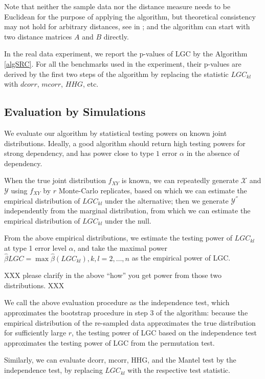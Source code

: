 \documentclass[11pt]{article}
\begin{document}
Note that neither the sample data nor the distance measure needs to be Euclidean for the purpose of applying the algorithm, but theoretical consistency may not hold for arbitrary distances, see in \cite{Lyons2013}; and the algorithm can start with two distance matrices $A$ and $B$ directly.

In the real data experiment, we report the p-values of LGC by the  Algorithm \ref{algSRC}. For all the benchmarks used in the experiment, their p-values are derived by the first two steps of the algorithm by replacing the statistic $LGC_{kl}$ with $dcorr$, $mcorr$, $HHG$, etc. 

\subsection{Evaluation by Simulations}

We evaluate our algorithm by statistical testing powers on known joint distributions. Ideally, a good algorithm should return high testing powers for strong dependency, and has power close to type $1$ error $\alpha$ in the absence of dependency.

When the true joint distribution $f_{XY}$ is known, we can repeatedly generate $\mathcal{X}$ and $\mathcal{Y}$ using $f_{XY}$ by $r$ Monte-Carlo replicates, based on which we can estimate the empirical distribution of $LGC_{kl}$ under the alternative; then we generate $\mathcal{Y}^{''}$ independently from the marginal distribution, from which we can estimate the empirical distribution of $LGC_{kl}$ under the null.

From the above empirical distributions, we estimate the testing power of $LGC_{kl}$ at type 1 error level $\alpha$, and take the maximal power $\hat{\beta}{LGC}=\max{\hat{\beta}(LGC_{kl}), k,l=2, \ldots,n}$ as the empirical power of LGC. 

XXX please clarify in the above ``how'' you get power from those two distributions. XXX

We call the above evaluation procedure as the independence test, which approximates the bootstrap procedure in step 3 of the algorithm: because the empirical distribution of the re-sampled data approximates the true distribution for sufficiently large $r$, the testing power of LGC based on the independence test approximates the testing power of LGC from the permutation test.

Similarly, we can evaluate dcorr, mcorr, HHG, and the Mantel test by the independence test, by replacing $LGC_{kl}$ with the respective test statistic. 
\end{document}
